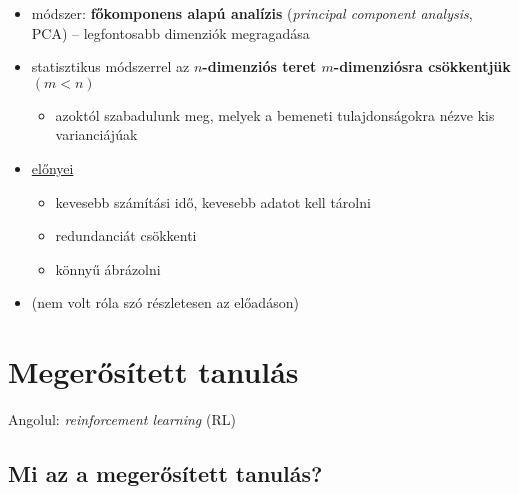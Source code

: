 \documentclass[a4paper, 11pt]{article}
\begin{document}
\begin{itemize}
	\item módszer: \textbf{főkomponens alapú analízis} (\textit{principal component analysis}, PCA) -- 
	legfontosabb dimenziók megragadása
	\item statisztikus módszerrel az \textbf{$n$-dimenziós teret $m$-dimenziósra csökkentjük} $(m < n)$
	\begin{itemize}
		\item azoktól szabadulunk meg, melyek a bemeneti tulajdonságokra nézve kis varianciájúak
	\end{itemize}
	\item \underline{előnyei}
	\begin{itemize}
		\item kevesebb számítási idő, kevesebb adatot kell tárolni
		\item redundanciát csökkenti
		\item könnyű ábrázolni
	\end{itemize}
	\iffalse
	\item módszer: keressünk új tengelyeket az adathoz, keressük meg az elsődleges komponenseket
	\begin{enumerate}
		\item középre igazítjuk az adatot
		\item kiszámítjuk a kovariancia-mátrixot
		\item sajátértékek halmaza
		\item új tulajdonságvektor
	\end{enumerate}
	\fi
	\item (nem volt róla szó részletesen az előadáson)
\end{itemize}

\newpage

\section{Megerősített tanulás}

Angolul: \textit{reinforcement learning} (RL)

\subsection{Mi az a megerősített tanulás?}
\end{document}
